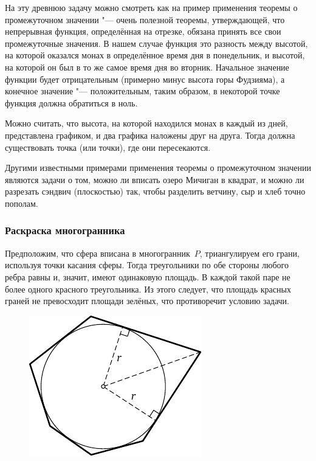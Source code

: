 \documentclass[twoside]{book}
\begin{document}
На эту древнюю задачу можно смотреть как на пример применения теоремы о промежуточном значении "--- очень полезной теоремы, утверждающей, что непрерывная функция, определённая на отрезке, обязана принять все свои промежуточные значения.
В нашем случае функция это разность между высотой, на которой оказался монах в определённое время дня в понедельник, и высотой, на которой он был в то же самое время дня во вторник.
Начальное значение функции будет отрицательным (примерно минус высота горы Фудзияма), а конечное значение "--- положительным, таким образом, в некоторой точке функция должна обратиться в ноль.

Можно считать, что высота, на которой находился монах в каждый из дней, представлена графиком, и два графика наложены друг на друга.
Тогда должна существовать точка (или точки), где они пересекаются.

Другими  известными примерами применения теоремы о промежуточном значении являются задачи о том, можно ли вписать озеро Мичиган в квадрат, и можно ли  разрезать сэндвич (плоскостью) так, чтобы разделить ветчину, сыр и хлеб точно пополам.

\subsubsection*{Раскраска многогранника}%

Предположим, что сфера вписана в многогранник~$P$, триангулируем его грани, используя точки касания сферы.
Тогда треугольники по обе стороны любого ребра равны и, значит, имеют одинаковую площадь.
В каждой такой паре не более одного красного треугольника.
Из этого следует, что площадь красных граней не превосходит площади зелёных, что противоречит условию задачи.\heart

\begin{figure}[!ht]
  \vspace{-\baselineskip}
\centering
\includegraphics{mp/wink-13}
\end{figure}
\end{document}
